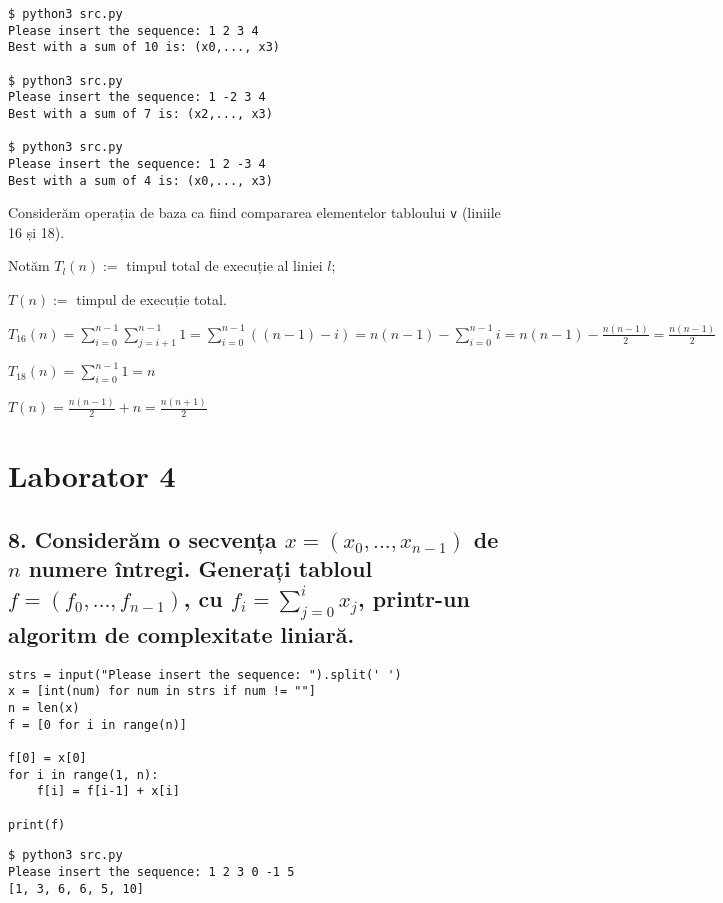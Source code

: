 \documentclass[11pt]{article}
\begin{document}
\begin{verbatim}
$ python3 src.py
Please insert the sequence: 1 2 3 4
Best with a sum of 10 is: (x0,..., x3)

$ python3 src.py
Please insert the sequence: 1 -2 3 4
Best with a sum of 7 is: (x2,..., x3)

$ python3 src.py
Please insert the sequence: 1 2 -3 4
Best with a sum of 4 is: (x0,..., x3)
\end{verbatim}

Considerăm operația de baza ca fiind compararea elementelor tabloului \texttt{v} (liniile 16 și 18).

Notăm $T_l(n) := $ timpul total de execuție al liniei $l$; 

$T(n) :=$ timpul de execuție total.
\newline

$T_{16}(n) = \sum\limits_{i=0}^{n-1} \sum\limits_{j=i+1}^{n-1}1 
= \sum\limits_{i=0}^{n-1}\left((n-1)-i\right)
= n(n-1) - \sum\limits_{i=0}^{n-1}i 
= n(n-1) - \frac{n(n-1)}{2}
= \frac{n(n-1)}{2}$

$T_{18}(n) = \sum\limits_{i=0}^{n-1}1 = n$

$T(n) = \frac{n(n-1)}{2} + n = \frac{n(n+1)}{2}$

\pagebreak

\section*{Laborator 4}
\label{sec:orgb64e7b0}
\subsection*{8. Considerăm o secvența \(x = (x_0, ..., x_{n-1})\) de \(n\) numere întregi. Generați tabloul \(f = (f_0, ..., f_{n-1})\), cu \(f_i = \sum\limits_{j=0}^{i}x_j\), printr-un algoritm de complexitate liniară.}
\label{sec:org85bf7a0}

\begin{verbatim}
strs = input("Please insert the sequence: ").split(' ')
x = [int(num) for num in strs if num != ""]
n = len(x)
f = [0 for i in range(n)]

f[0] = x[0]
for i in range(1, n):
    f[i] = f[i-1] + x[i]

print(f)

\end{verbatim}

\begin{verbatim}
$ python3 src.py
Please insert the sequence: 1 2 3 0 -1 5
[1, 3, 6, 6, 5, 10]
\end{verbatim}
\end{document}
